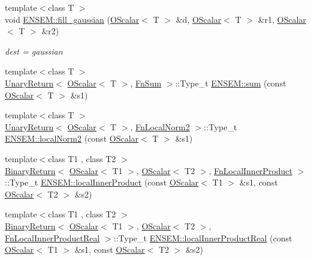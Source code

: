 \begin{DoxyCompactItemize}
{\footnotesize template$<$class T $>$ }\\void \mbox{\hyperlink{group__obsscalar_gaf665bb772c121b0cab02a5f3244b4c3d}{E\+N\+S\+E\+M\+::fill\+\_\+gaussian}} (\mbox{\hyperlink{classENSEM_1_1OScalar}{O\+Scalar}}$<$ T $>$ \&d, \mbox{\hyperlink{classENSEM_1_1OScalar}{O\+Scalar}}$<$ T $>$ \&r1, \mbox{\hyperlink{classENSEM_1_1OScalar}{O\+Scalar}}$<$ T $>$ \&r2)
\begin{DoxyCompactList}\small\item\em dest = gaussian \end{DoxyCompactList}\item 
{\footnotesize template$<$class T $>$ }\\\mbox{\hyperlink{structENSEM_1_1UnaryReturn}{Unary\+Return}}$<$ \mbox{\hyperlink{classENSEM_1_1OScalar}{O\+Scalar}}$<$ T $>$, \mbox{\hyperlink{structENSEM_1_1FnSum}{Fn\+Sum}} $>$\+::Type\+\_\+t \mbox{\hyperlink{group__obsscalar_ga969a0fc381c5a006e976f67c513c4828}{E\+N\+S\+E\+M\+::sum}} (const \mbox{\hyperlink{classENSEM_1_1OScalar}{O\+Scalar}}$<$ T $>$ \&s1)
\item 
{\footnotesize template$<$class T $>$ }\\\mbox{\hyperlink{structENSEM_1_1UnaryReturn}{Unary\+Return}}$<$ \mbox{\hyperlink{classENSEM_1_1OScalar}{O\+Scalar}}$<$ T $>$, \mbox{\hyperlink{structENSEM_1_1FnLocalNorm2}{Fn\+Local\+Norm2}} $>$\+::Type\+\_\+t \mbox{\hyperlink{group__obsscalar_ga2bc0a069388839d76a68f281dce936a6}{E\+N\+S\+E\+M\+::local\+Norm2}} (const \mbox{\hyperlink{classENSEM_1_1OScalar}{O\+Scalar}}$<$ T $>$ \&s1)
\item 
{\footnotesize template$<$class T1 , class T2 $>$ }\\\mbox{\hyperlink{structENSEM_1_1BinaryReturn}{Binary\+Return}}$<$ \mbox{\hyperlink{classENSEM_1_1OScalar}{O\+Scalar}}$<$ T1 $>$, \mbox{\hyperlink{classENSEM_1_1OScalar}{O\+Scalar}}$<$ T2 $>$, \mbox{\hyperlink{structENSEM_1_1FnLocalInnerProduct}{Fn\+Local\+Inner\+Product}} $>$\+::Type\+\_\+t \mbox{\hyperlink{group__obsscalar_ga17966d3d3b6922670f83bb3f96b1cd76}{E\+N\+S\+E\+M\+::local\+Inner\+Product}} (const \mbox{\hyperlink{classENSEM_1_1OScalar}{O\+Scalar}}$<$ T1 $>$ \&s1, const \mbox{\hyperlink{classENSEM_1_1OScalar}{O\+Scalar}}$<$ T2 $>$ \&s2)
\item 
{\footnotesize template$<$class T1 , class T2 $>$ }\\\mbox{\hyperlink{structENSEM_1_1BinaryReturn}{Binary\+Return}}$<$ \mbox{\hyperlink{classENSEM_1_1OScalar}{O\+Scalar}}$<$ T1 $>$, \mbox{\hyperlink{classENSEM_1_1OScalar}{O\+Scalar}}$<$ T2 $>$, \mbox{\hyperlink{structENSEM_1_1FnLocalInnerProductReal}{Fn\+Local\+Inner\+Product\+Real}} $>$\+::Type\+\_\+t \mbox{\hyperlink{group__obsscalar_ga83c87e37c0e8b624401c37ff72a5f23c}{E\+N\+S\+E\+M\+::local\+Inner\+Product\+Real}} (const \mbox{\hyperlink{classENSEM_1_1OScalar}{O\+Scalar}}$<$ T1 $>$ \&s1, const \mbox{\hyperlink{classENSEM_1_1OScalar}{O\+Scalar}}$<$ T2 $>$ \&s2)

\end{DoxyCompactItemize}
